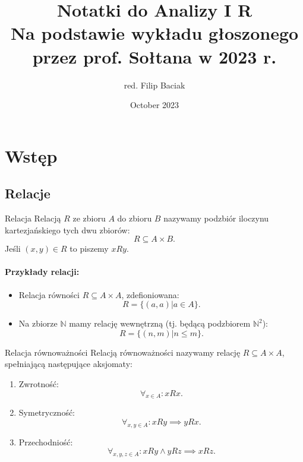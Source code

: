 \documentclass{article}
\title{%
Notatki do Analizy I R \\
\large Na podstawie wykładu głoszonego przez prof. Sołtana w 2023 r.}
\author{red. Filip Baciak}
\date{October 2023}
\newcommand{\N}{\mathbb{N}}
\begin{document}
\maketitle

\section{Wstęp}
    \subsection{Relacje}
    \begin{defr}{Relacja}
        Relacją $R$ ze zbioru $A$ do zbioru $B$ nazywamy podzbiór iloczynu kartezjańskiego tych dwu zbiorów:
        \begin{equation}
            R \subseteq A \times B.
        \end{equation}
        Jeśli $(x, y) \in R$ to piszemy $xRy$.
    \end{defr}

    \paragraph*{Przykłady relacji:}
    \begin{itemize}
        \item Relacja równości $R \subseteq A \times A$, zdefioniowana:
            \begin{equation}
                R = \{(a, a) | a \in A\}.
            \end{equation}
        \item Na zbiorze $\N$ mamy relację wewnętrzną (tj. będącą podzbiorem $\N ^2$):
            \begin{equation}
                R = \{(n, m) | n \leqslant m\}.
            \end{equation}
    \end{itemize}

    \begin{defr}{Relacja równoważności}
        Relacją równoważności nazywamy relację $R \subseteq A \times A$, spełniającą następujące aksjomaty:
        \begin{enumerate}
            \item Zwrotność:
                \begin{equation}
                    \forall_{x \in A}: xRx.
                \end{equation}
            \item Symetryczność:
                \begin{equation}
                    \forall_{x, y \in A}: xRy \implies yRx.
                \end{equation}
            \item Przechodniość:
                \begin{equation}
                    \forall_{x, y, z\in A}: xRy \land yRz \implies xRz.
                \end{equation}    
        \end{enumerate}
    \end{defr}
\end{document}
